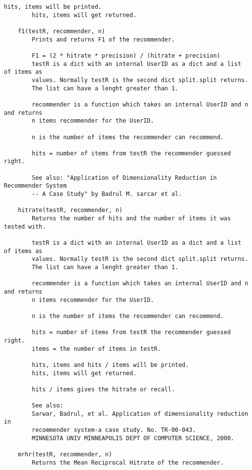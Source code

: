 \begin{lstlisting}[style=docstring]
        hits, items will be printed.
        hits, items will get returned.
    
    f1(testR, recommender, n)
        Prints and returns F1 of the recommender.
        
        F1 = (2 * hitrate * precision) / (hitrate + precision)
        testR is a dict with an internal UserID as a dict and a list of items as
        values. Normally testR is the second dict split.split returns.
        The list can have a lenght greater than 1.
        
        recommender is a function which takes an internal UserID and n and returns
        n items recommender for the UserID.
        
        n is the number of items the recommender can recommend.
        
        hits = number of items from testR the recommender guessed right.
        
        See also: "Application of Dimensionality Reduction in Recommender System
        -- A Case Study" by Badrul M. sarcar et al.
    
    hitrate(testR, recommender, n)
        Returns the number of hits and the number of items it was tested with.
        
        testR is a dict with an internal UserID as a dict and a list of items as
        values. Normally testR is the second dict split.split returns.
        The list can have a lenght greater than 1.
        
        recommender is a function which takes an internal UserID and n and returns
        n items recommender for the UserID.
        
        n is the number of items the recommender can recommend.
        
        hits = number of items from testR the recommender guessed right.
        items = the number of items in testR.
        
        hits, items and hits / items will be printed.
        hits, items will get returned.
        
        hits / items gives the hitrate or recall.
        
        See also:
        Sarwar, Badrul, et al. Application of dimensionality reduction in
        recommender system-a case study. No. TR-00-043.
        MINNESOTA UNIV MINNEAPOLIS DEPT OF COMPUTER SCIENCE, 2000.
    
    mrhr(testR, recommender, n)
        Returns the Mean Reciprocal Hitrate of the recommender.
        

\end{lstlisting}
